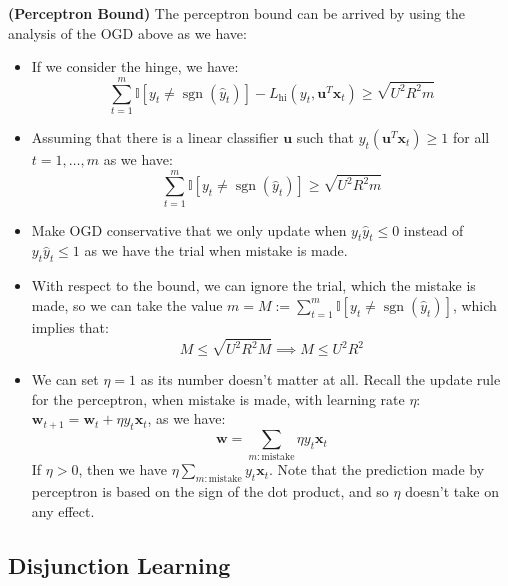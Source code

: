 \begin{remark}{\textbf{(Perceptron Bound)}}
    The perceptron bound can be arrived by using the analysis of the OGD above as we have:
    \begin{itemize}
        \item If we consider the hinge, we have:
        \begin{equation*}
            \sum^m_{t=1} \mathbb{I}[y_t \ne \operatorname{sgn}(\hat{y}_t)] - L_\text{hi}(y_t, \boldsymbol u^T\boldsymbol x_t) \ge \sqrt{U^2R^2m}
        \end{equation*}
        \item Assuming that there is a linear classifier $\boldsymbol u$ such that $y_t(\boldsymbol u^T\boldsymbol x_t) \ge 1$ for all $t=1,\dots,m$ as we have:
        \begin{equation*}
            \sum^m_{t=1}\mathbb{I}[y_t \ne \operatorname{sgn}(\hat{y}_t)]\ge \sqrt{U^2R^2m}
        \end{equation*}
        \item Make OGD conservative that we only update when $y_t\hat{y}_t\le0$ instead of $y_t\hat{y}_t\le1$ as we have the trial when mistake is made.
        \item With respect to the bound, we can ignore the trial, which the mistake is made, so we can take the value $m = M := \sum^m_{t=1}\mathbb{I}[y_t \ne \operatorname{sgn}(\hat{y}_t)]$, which implies that:
        \begin{equation*}
            M \le \sqrt{U^2R^2M} \implies M\le U^2R^2
        \end{equation*}
        \item We can set $\eta=1$ as its number doesn't matter at all. Recall the update rule for the perceptron, when mistake is made, with learning rate $\eta$: $\boldsymbol w_{t+1} = \boldsymbol w_t + \eta y_t\boldsymbol x_t$, as we have:
        \begin{equation*}
            \boldsymbol w = \sum_{m:\text{mistake}}\eta y_t\boldsymbol x_t
        \end{equation*}
        If $\eta > 0$, then we have $\eta\sum_{m:\text{mistake}}y_t\boldsymbol x_t$. Note that the prediction made by perceptron is based on the sign of the dot product, and so $\eta$ doesn't take on any effect.
    \end{itemize}
\end{remark}

\subsection{Disjunction Learning}

